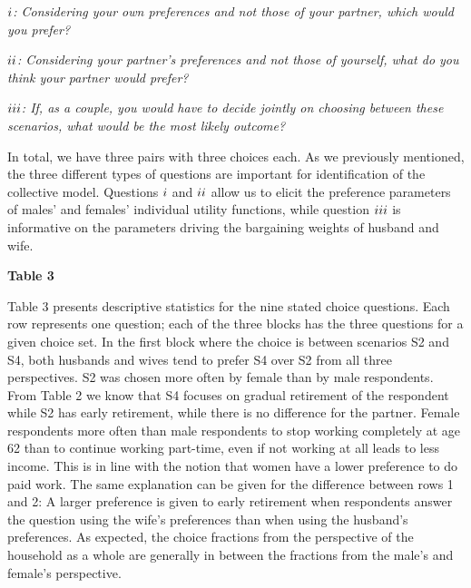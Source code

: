\documentclass[11pt,letter]{article}
\begin{document}
\par \emph{$\uppercase \expandafter {\romannumeral 1}$: Considering your own preferences and not those of your partner, which would you prefer? }
\par \emph{$\uppercase \expandafter {\romannumeral 2}$: Considering your partner's preferences and not those of yourself, what do you think your partner would prefer?}
\par \emph{$\uppercase \expandafter {\romannumeral 3}$: If, as a couple, you would have to decide jointly on choosing between these scenarios, what would be the most likely outcome?}
\\

\par In total, we have three pairs with three choices each. As we previously mentioned, the three different types of questions are important for identification of the collective model. Questions $\uppercase \expandafter {\romannumeral 1}$ and $\uppercase \expandafter {\romannumeral 2}$ allow us to elicit the preference parameters of males' and females' individual utility functions, while question $\uppercase \expandafter {\romannumeral 3}$ is informative on the parameters driving the bargaining weights of husband and wife.

\begin{center}
\textbf{Table 3}
\end{center}

\par Table 3 presents descriptive statistics for the nine stated choice questions. Each row represents one question; each of the three blocks has the three questions for a given choice set. In the first block where the choice is between scenarios S2 and S4, both husbands and wives tend to prefer S4 over S2 from all three perspectives. S2 was chosen more often by female than by male respondents.
From Table 2 we know that S4 focuses on gradual retirement of the respondent while S2 has early retirement, while there is no difference for the partner. Female respondents more often than male respondents to stop working completely at age 62 than to continue working part-time, even if not working at all leads to less income. This is in line with the notion that women have a lower preference to do paid work. The same explanation can be given for the difference between rows 1 and 2: A larger preference is given to early retirement when respondents answer the question using the wife's preferences than when using the husband's preferences. As expected, the choice fractions from the perspective of the household as a whole are generally in between the fractions from the male's and female's perspective.
\end{document}
